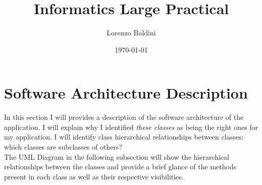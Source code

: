 \documentclass{article}
\title{Informatics Large Practical} %
\author{Lorenzo Baldini} %
\date{\today} %
\begin{document}
\maketitle %





\tableofcontents
\pagebreak


\section{Software Architecture Description}

In this section I will provides a description of the software architecture of the application. I will explain why I identified \textit{these classes} as being the right ones for my application. I will identify class hierarchical relationships between classes: which classes are subclasses of others?\\[1]

The UML Diagram in the following subsection will show the hierarchical relationships between the classes and provide a brief glance of the methods present in each class as well as their respective visibilities.
\end{document}

